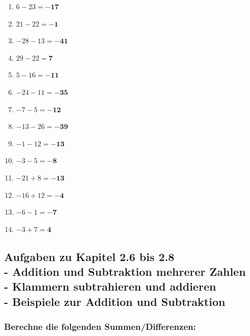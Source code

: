 \documentclass[a4paper,10pt]{article} %
\begin{document}
\begin{enumerate}
  \item \(6 - 23 =
    \mathbf{-17}\) %

  \item \(21 - 22 =
    \mathbf{-1}\) %

  \item \(-28 - 13 =
    \mathbf{-41}\) %

  \item \(29 - 22 =
    \mathbf{7}\) %

  \item \(5 - 16 =
    \mathbf{-11}\) %

  \item \(-24 - 11 =
    \mathbf{-35}\) %

  \item \(-7 - 5 =
    \mathbf{-12}\) %

  \item \(-13 - 26 =
    \mathbf{-39}\) %

  \item \(-1 - 12 =
    \mathbf{-13}\) %

  \item \(-3 - 5 =
    \mathbf{-8}\) %

  \item \(-21 + 8 =
    \mathbf{-13}\) %

  \item \(-16 + 12 =
    \mathbf{-4}\) %

  \item \(-6 - 1 =
    \mathbf{-7}\) %

  \item \(-3 + 7 =
    \mathbf{4}\) %

\end{enumerate}

\subsection{Aufgaben zu Kapitel 2.6 bis 2.8 \\
  - Addition und Subtraktion mehrerer Zahlen \\
  - Klammern subtrahieren und addieren \\
  - Beispiele zur Addition und Subtraktion}

\subsubsection{Berechne die folgenden Summen/Differenzen:} %
\end{document}
